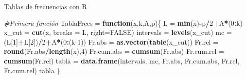 \documentclass[
  ignorenonframetext,
]{beamer}
\newenvironment{Shaded}{\begin{snugshade}}{\end{snugshade}}
\newcommand{\CommentTok}[1]{\textcolor[rgb]{0.56,0.35,0.01}{\textit{#1}}}
\newcommand{\ControlFlowTok}[1]{\textcolor[rgb]{0.13,0.29,0.53}{\textbf{#1}}}
\newcommand{\DataTypeTok}[1]{\textcolor[rgb]{0.13,0.29,0.53}{#1}}
\newcommand{\DecValTok}[1]{\textcolor[rgb]{0.00,0.00,0.81}{#1}}
\newcommand{\KeywordTok}[1]{\textcolor[rgb]{0.13,0.29,0.53}{\textbf{#1}}}
\newcommand{\NormalTok}[1]{#1}
\newcommand{\OperatorTok}[1]{\textcolor[rgb]{0.81,0.36,0.00}{\textbf{#1}}}
\newcommand{\OtherTok}[1]{\textcolor[rgb]{0.56,0.35,0.01}{#1}}
\newcommand{\StringTok}[1]{\textcolor[rgb]{0.31,0.60,0.02}{#1}}
\begin{document}
\begin{frame}[fragile]{Tablas de frecuencias con R}
\protect\hypertarget{tablas-de-frecuencias-con-r}{}
\begin{Shaded}
\begin{Highlighting}[]
\CommentTok{\#Primera función}
\NormalTok{TablaFrecs =}\StringTok{ }\ControlFlowTok{function}\NormalTok{(x,k,A,p)\{ }
\NormalTok{  L =}\StringTok{ }\KeywordTok{min}\NormalTok{(x)}\OperatorTok{{-}}\NormalTok{p}\OperatorTok{/}\DecValTok{2}\OperatorTok{+}\NormalTok{A}\OperatorTok{*}\NormalTok{(}\DecValTok{0}\OperatorTok{:}\NormalTok{k)}
\NormalTok{  x\_cut =}\StringTok{ }\KeywordTok{cut}\NormalTok{(x, }\DataTypeTok{breaks =}\NormalTok{ L, }\DataTypeTok{right=}\OtherTok{FALSE}\NormalTok{)}
\NormalTok{  intervals =}\StringTok{ }\KeywordTok{levels}\NormalTok{(x\_cut)}
\NormalTok{  mc =}\StringTok{ }\NormalTok{(L[}\DecValTok{1}\NormalTok{]}\OperatorTok{+}\NormalTok{L[}\DecValTok{2}\NormalTok{])}\OperatorTok{/}\DecValTok{2}\OperatorTok{+}\NormalTok{A}\OperatorTok{*}\NormalTok{(}\DecValTok{0}\OperatorTok{:}\NormalTok{(k}\DecValTok{{-}1}\NormalTok{))}
\NormalTok{  Fr.abs =}\StringTok{ }\KeywordTok{as.vector}\NormalTok{(}\KeywordTok{table}\NormalTok{(x\_cut)) }
\NormalTok{  Fr.rel =}\StringTok{ }\KeywordTok{round}\NormalTok{(Fr.abs}\OperatorTok{/}\KeywordTok{length}\NormalTok{(x),}\DecValTok{4}\NormalTok{) }
\NormalTok{  Fr.cum.abs =}\StringTok{ }\KeywordTok{cumsum}\NormalTok{(Fr.abs) }
\NormalTok{  Fr.cum.rel =}\StringTok{ }\KeywordTok{cumsum}\NormalTok{(Fr.rel)}
\NormalTok{  tabla =}\StringTok{ }\KeywordTok{data.frame}\NormalTok{(intervals, mc, Fr.abs, Fr.cum.abs, Fr.rel, Fr.cum.rel)}
\NormalTok{  tabla}
\NormalTok{  \}}
\end{Highlighting}
\end{Shaded}
\end{frame}
\end{document}
